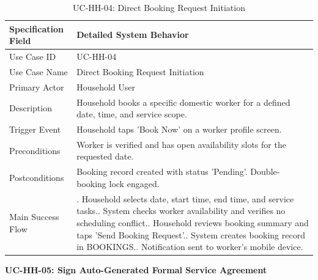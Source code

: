 \documentclass[12pt,a4paper]{article}
\begin{document}
\begin{longtable}{|>{\raggedright\arraybackslash}p{\dimexpr(\linewidth-4\tabcolsep-3\arrayrulewidth)/2\relax}|>{\raggedright\arraybackslash}p{\dimexpr(\linewidth-4\tabcolsep-3\arrayrulewidth)/2\relax}|}
\caption{UC-HH-04: Direct Booking Request Initiation}\label{tab:uc-hh-04}\\
\hline
Specification Field & Detailed System Behavior \\ \hline
Use Case ID & UC-HH-04 \\ \hline
Use Case Name & Direct Booking Request Initiation \\ \hline
Primary Actor & Household User \\ \hline
Description & Household books a specific domestic worker for a defined date, time, and service scope. \\ \hline
Trigger Event & Household taps 'Book Now' on a worker profile screen. \\ \hline
Preconditions & Worker is verified and has open availability slots for the requested date. \\ \hline
Postconditions & Booking record created with status 'Pending'. Double-booking lock engaged. \\ \hline
Main Success Flow & 1. Household selects date, start time, end time, and service tasks.\newline 2. System checks worker availability and verifies no scheduling conflict.\newline 3. Household reviews booking summary and taps 'Send Booking Request'.\newline 4. System creates booking record in BOOKINGS.\newline 5. Notification sent to worker's mobile device. \\ \hline
\end{longtable}
\endgroup
\clearpage
\noindent\textbf{UC-HH-05: Sign Auto-Generated Formal Service Agreement}\par
\vspace{4pt}
\begingroup\small\setlength{\tabcolsep}{3pt}\renewcommand{\arraystretch}{1.15}
\end{document}
